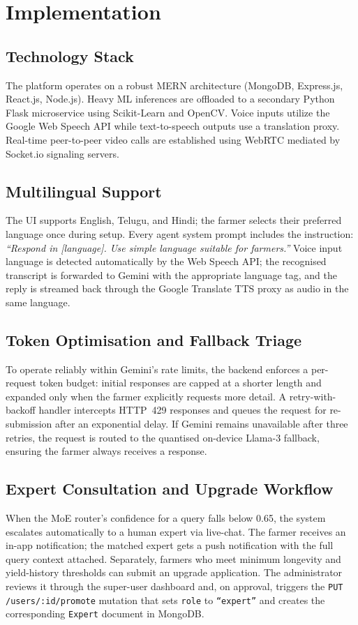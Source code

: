 \documentclass[conference]{IEEEtran}
\begin{document}
\section{Implementation}

\subsection{Technology Stack}
The platform operates on a robust MERN architecture (MongoDB, Express.js, React.js, Node.js). Heavy ML inferences are offloaded to a secondary Python Flask microservice using Scikit-Learn and OpenCV. Voice inputs utilize the Google Web Speech API while text-to-speech outputs use a translation proxy. Real-time peer-to-peer video calls are established using WebRTC mediated by Socket.io signaling servers.
\subsection{Multilingual Support}
The UI supports English, Telugu, and Hindi; the farmer selects their
preferred language once during setup. Every agent system prompt includes the
instruction: \textit{``Respond in [language]. Use simple language suitable
for farmers.''} Voice input language is detected automatically by the Web
Speech API; the recognised transcript is forwarded to Gemini with the
appropriate language tag, and the reply is streamed back through the Google
Translate TTS proxy as audio in the same language.

\subsection{Token Optimisation and Fallback Triage}
To operate reliably within Gemini's rate limits, the backend enforces a
per-request token budget: initial responses are capped at a shorter length
and expanded only when the farmer explicitly requests more detail. A
retry-with-backoff handler intercepts HTTP~429 responses and queues the
request for re-submission after an exponential delay. If Gemini remains
unavailable after three retries, the request is routed to the quantised
on-device Llama-3 fallback, ensuring the farmer always receives a response.

\subsection{Expert Consultation and Upgrade Workflow}
When the MoE router's confidence for a query falls below 0.65, the system
escalates automatically to a human expert via live-chat. The farmer receives
an in-app notification; the matched expert gets a push notification with
the full query context attached. Separately, farmers who meet minimum
longevity and yield-history thresholds can submit an upgrade application.
The administrator reviews it through the super-user dashboard and, on
approval, triggers the \texttt{PUT /users/:id/promote} mutation that sets
\texttt{role} to \texttt{``expert''} and creates the corresponding
\texttt{Expert} document in MongoDB.
\end{document}

